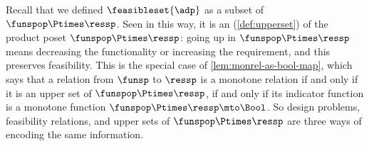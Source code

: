 
\begin{remark}
    \label{rem:feasible-set-upper-set}
    Recall that we defined $\feasibleset{\adp}$ as a subset of $\funspop \Ptimes \ressp$.
    Seen in this way, it is an  (\cref{def:upperset}) of the product poset $\funspop \Ptimes \ressp$: going up in $\funspop \Ptimes \ressp$ means decreasing the functionality or increasing the requirement, and this preserves feasibility.
    This is the special case of \cref{lem:monrel-as-bool-map}, which says that a relation from $\funsp$ to $\ressp$ is a monotone relation if and only if it is an upper set of $\funspop \Ptimes \ressp$, if and only if its indicator function is a monotone function $\funspop \Ptimes \ressp \mto \Bool$.
    So design problems, feasibility relations, and upper sets of $\funspop \Ptimes \ressp$ are three ways of encoding the same information.
\end{remark}

%
%
%
%
%
%


